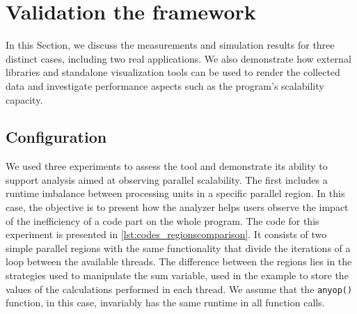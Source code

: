 %

\section{Validation the framework}\label{sec:validation_the_framework}
In this Section, we discuss the measurements and simulation results for three distinct cases, including two real applications. We also demonstrate how external libraries and standalone visualization tools can be used to render the collected data and investigate performance aspects such as the program's scalability capacity.

\subsection{Configuration} \label{subsec:configuration_pascal}

We used three experiments to assess the tool and demonstrate its ability to support analysis aimed at observing parallel scalability. The first includes a runtime imbalance between processing units in a specific parallel region. In this case, the objective is to present how the analyzer helps users observe the impact of the inefficiency of a code part on the whole program. The code for this experiment is presented in \cref{lst:codes_regionscomparison}. It consists of two simple parallel regions with the same functionality that divide the iterations of a loop between the available threads. The difference between the regions lies in the strategies used to manipulate the sum variable, used in the example to store the values of the calculations performed in each thread. We assume that the {\tt anyop()} function, in this case, invariably has the same runtime in all function calls.

